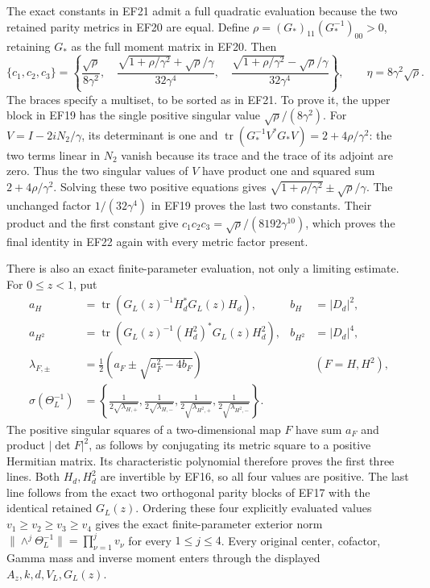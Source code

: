 The exact constants in EF21 admit a full quadratic
evaluation because the two retained parity metrics
in EF20 are equal. Define
$\rho=(G_*)_{11}(G_*^{-1})_{00}>0$, retaining $G_*$
as the full moment matrix in EF20. Then
\begin{equation}
 \{c_1,c_2,c_3\}=\left\{
 \frac{\sqrt\rho}{8\gamma^2},\quad
 \frac{\sqrt{1+\rho/\gamma^2}+\sqrt\rho/\gamma}{32\gamma^4},\quad
 \frac{\sqrt{1+\rho/\gamma^2}-\sqrt\rho/\gamma}{32\gamma^4}
 \right\},\qquad \eta=8\gamma^2\sqrt\rho.
 \tag{EF23}
\end{equation}
The braces specify a multiset, to be sorted as in EF21.
To prove it, the upper block in EF19 has the single
positive singular value $\sqrt\rho/(8\gamma^2)$.
For $V=I-2iN_2/\gamma$, its determinant is one and
$\operatorname{tr}(G_*^{-1}V^*G_*V)=2+4\rho/\gamma^2$:
the two terms linear in $N_2$ vanish because its trace
and the trace of its adjoint are zero. Thus the two
singular values of $V$ have product one and squared
sum $2+4\rho/\gamma^2$. Solving these two positive
equations gives $\sqrt{1+\rho/\gamma^2}\pm\sqrt\rho/\gamma$.
The unchanged factor $1/(32\gamma^4)$ in EF19 proves
the last two constants. Their product and the first
constant give $c_1c_2c_3=\sqrt\rho/(8192\gamma^{10})$,
which proves the final identity in EF22 again with
every metric factor present.

There is also an exact finite-parameter evaluation,
not only a limiting estimate. For $0\le z<1$, put
\begin{equation}
\begin{aligned}
 a_H&=\operatorname{tr}(G_L(z)^{-1}H_d^*G_L(z)H_d),&
 b_H&=|D_d|^2,\\
 a_{H^2}&=\operatorname{tr}(G_L(z)^{-1}(H_d^2)^*G_L(z)H_d^2),&
 b_{H^2}&=|D_d|^4,\\
 \lambda_{F,\pm}&=\tfrac12(a_F\pm\sqrt{a_F^2-4b_F})
       &&(F=H,H^2),\\
 \sigma(\Theta_L^{-1})&=
 \left\{\frac1{2\sqrt{\lambda_{H,+}}},
 \frac1{2\sqrt{\lambda_{H,-}}},
 \frac1{2\sqrt{\lambda_{H^2,+}}},
 \frac1{2\sqrt{\lambda_{H^2,-}}}\right\}.
\end{aligned}\tag{EF24}
\end{equation}
The positive singular squares of a two-dimensional
map $F$ have sum $a_F$ and product $|\det F|^2$,
as follows by conjugating its metric square to a
positive Hermitian matrix. Its characteristic
polynomial therefore proves the first three lines.
Both $H_d,H_d^2$ are invertible by EF16, so all
four values are positive. The last line follows
from the exact two orthogonal parity blocks of
EF17 with the identical retained $G_L(z)$.
Ordering these four explicitly evaluated values
$v_1\ge v_2\ge v_3\ge v_4$ gives the exact
finite-parameter exterior norm
$\|\wedge^j\Theta_L^{-1}\|=\prod_{\nu=1}^jv_\nu$
for every $1\le j\le4$. Every original center,
cofactor, Gamma mass and inverse moment enters
through the displayed $A_z,k,d,V_L,G_L(z)$.

